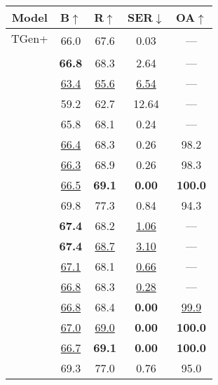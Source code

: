 \begin{table}[t!]
    \centering
    \begin{tabular}{ll cccc}
    \toprule
    \multicolumn{2}{c}{Model}&B$\uparrow$&R$\uparrow$&SER$\downarrow$&OA$\uparrow$    \\
    \midrule
    \multicolumn{2}{c}{TGen+} & \multirow{2}{*}{66.0} & \multirow{2}{*}{67.6} &
    \multirow{2}{*}{0.03} & \multirow{2}{*}{---}\\
    \multicolumn{2}{c}{\footnotesize \cite{dusek2019}} & \\
    \midrule
    \parbox[t]{2mm}{}
     &   & \textbf{66.8} & 68.3 & 2.64 & --- \\
     &   & \uline{63.4} & \uline{65.6} & \uline{6.54} & --- \\
     &   & 59.2 & 62.7 & 12.64 & --- \\
     &   & 65.8 & 68.1 & 0.24 & --- \\
     &   & \uline{66.4} & 68.3 & 0.26 & 98.2 \\
     &   & \uline{66.3} & 68.9 & 0.26 & 98.3 \\
     &   & \uline{66.5} & \textbf{69.1} & \textbf{0.00} & \textbf{100.0} \\
     &   & 69.8 & 77.3 & 0.84 & 94.3 \\
    \midrule
    \parbox[t]{2mm}{}
     &   & \textbf{67.4} & 68.2 & \uline{1.06} & --- \\
     &   & \textbf{67.4} & \uline{68.7} & \uline{3.10} & --- \\
     &   & \uline{67.1} & 68.1 & \uline{0.66} & --- \\
     &   & \uline{66.8} & 68.3 & \uline{0.28} & --- \\
     &   & \uline{66.8} & 68.4 & \textbf{0.00} & \uline{99.9} \\
     &   & \uline{67.0} & \uline{69.0} & \textbf{0.00} & \textbf{100.0} \\
     &   & \uline{66.7} & \textbf{69.1} & \textbf{0.00} & \textbf{100.0} \\
     &   & 69.3 & 77.0 & 0.76 & 95.0 \\

\end{tabular}
\end{table}
